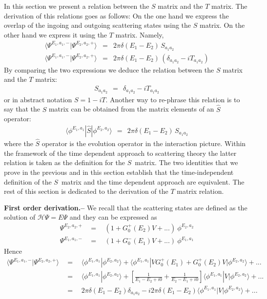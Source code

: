 \documentclass[onecolumn,fleqn, 11pt]{revtex4}
\newcommand{\beq}{\begin{eqnarray}}
\newcommand{\eeq}{\end{eqnarray}}
\begin{document}
In this section we present a relation  
between the $S$ matrix and the $T$ matrix. 
The derivation of this relations 
goes as follows: On the one hand 
we express the overlap of the ingoing and outgoing 
scattering states using the $S$ matrix. On the other 
hand we express it using the $T$ matrix. Namely, 
\beq
\langle \Psi^{E_{1},a_{1},-}|\Psi^{E_{2},a_{2},+}\rangle 
&=& 2\pi\delta(E_{1}-E_{2}) \, S_{a_{1}a_{2}}
\\ \nonumber
\langle \Psi^{E_{1},a_{1},-}|\Psi^{E_{2},a_{2},+}\rangle 
&=& 2\pi\delta(E_{1}-E_{2}) \, (\delta_{a_{1}a_{2}}-iT_{a_{1}a_{2}}) 
\eeq
By comparing the two expressions we deduce the relation between 
the $S$ matrix and the $T$ matrix:   
\beq
S_{a_{1}a_{2}} \ \ = \ \ \delta_{a_{1}a_{2}}-iT_{a_{1}a_{2}}
\eeq
or in abstract notation $S=1-iT$.  
Another way to re-phrase this relation is 
to say that the $S$ matrix can be obtained 
from the matrix elements of an $\hat{S}$ operator:
\beq
\langle \phi^{E_{1},a_{1}} | \hat{S} | \phi^{E_{2},a_{2}}\rangle
\ \ = \ \  2\pi\delta(E_{1}-E_{2}) \, S_{a_{1}a_{2}}
\eeq
where the $\hat{S}$ operator is the evolution operator 
in the interaction picture. Within the framework 
of the time dependent approach to scattering theory the 
latter relation is taken as the definition for the $S$~matrix. 
The two identities that we prove in the previous and in this 
section establish that the time-independent definition 
of the $S$~matrix and the time dependent approach are equivalent.    
The rest of this section is dedicated to the derivation 
of the $T$ matrix relation. 

{\bf First order derivation.-- } 
We recall that the scattering states 
are defined as the solution of $\mathcal{H}\Psi=E\Psi$ 
and they can be expressed as  
\beq
\Psi^{E_2,a_2,+} \ \ &=& \ \ \left(1+G_0^{+}(E_2)V + ...\right) \ \phi^{E_2,a_2}
\\
\Psi^{E_1,a_1,-} \ \ &=& \ \ \left(1+G_0^{-}(E_1)V + ...\right) \ \phi^{E_1,a_1}
\eeq
Hence
\beq
\langle \Psi^{E_1,a_1,-}|\Psi^{E_2,a_2,+} \rangle 
\ \ &=& \ \ 
\langle \phi^{E_1,a_1}|\phi^{E_2,a_2} \rangle 
+ \langle \phi^{E_1,a_1}|VG_0^{+}(E_1)+G_0^{+}(E_2)V|\phi^{E_2,a_2} \rangle + ...
\\
\ \ &=& \ \
\langle \phi^{E_1,a_1}|\phi^{E_2,a_2} \rangle
+ \left[ \frac{1}{E_1-E_2+i0} + \frac{1}{E_2-E_1+i0} \right] \langle \phi^{E_1,a_1}|V|\phi^{E_2,a_2} \rangle + ...
\\
\ \ &=& \ \
2\pi\delta(E_{1}-E_{2}) \delta_{a_{1}a_{2}}
- i2\pi\delta(E_{1}-E_{2})
\langle \phi^{E_1,a_1} \left|V\right|\phi^{E_2,a_2}\rangle + ...
\eeq
\end{document}
